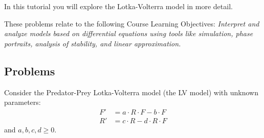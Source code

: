 		\begin{objectives}
			In this tutorial you will explore the Lotka-Volterra model in more detail.

	These problems relate to the following Course Learning Objectives:
			\textit{
Interpret and analyze models based on differential equations using tools like simulation, phase
portraits, analysis of stability, and linear approximation.
			}
		\end{objectives}

\subsection*{Problems}

Consider the Predator-Prey Lotka-Volterra model (the LV model) with unknown parameters:
\begin{align*}
	F' &= a \cdot R\cdot F - b \cdot F \\
	R' &= c \cdot R - d \cdot R \cdot F
\end{align*}
and $a,b,c,d\geq 0$. 


